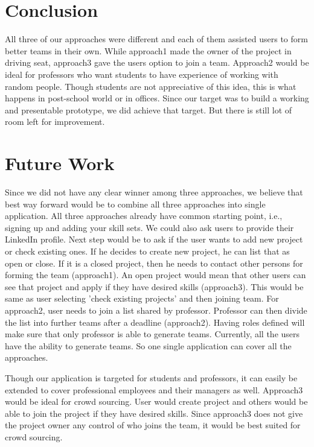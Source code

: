 \documentclass[conference]{IEEEtran}
\begin{document}
\section{Conclusion}
All three of our approaches were different and each of them assisted users to form better teams in their own. While approach1 made the owner of the project in driving seat, approach3 gave the users option to join a team. Approach2 would be ideal for professors who want students to have experience of working with random people. Though students are not appreciative of this idea, this is what happens in post-school world or in offices. Since our target was to build a working and presentable prototype, we did achieve that target. But there is still lot of room left for improvement. 


\section{Future Work}
Since we did not have any clear winner among three approaches, we believe that best way forward would be to combine all three approaches into single application. All three approaches already have common starting point, i.e., signing up and adding your skill sets. We could also ask users to provide their LinkedIn profile. Next step would be to ask if the user wants to add new project or check existing ones. If he decides to create new project, he can list that as open or close. If it is a closed project, then he needs to contact other persons for forming the team (approach1). An open project would mean that other users can see that project and apply if they have desired skills (approach3). This would be same as user selecting 'check existing projects' and then joining team. For approach2, user needs to join a list shared by professor. Professor can then divide the list into further teams after a deadline (approach2). Having roles defined will make sure that only professor is able to generate teams. Currently, all the users have the ability to generate teams. So one single application can cover all the approaches.  

Though our application is targeted for students and professors, it can easily be extended to cover professional employees and their managers as well. Approach3 would be ideal for crowd sourcing. User would create project and others would be able to join the project if they have desired skills. Since approach3 does not give the project owner any control of who joins the team, it would be best suited for crowd sourcing. 
\end{document}
